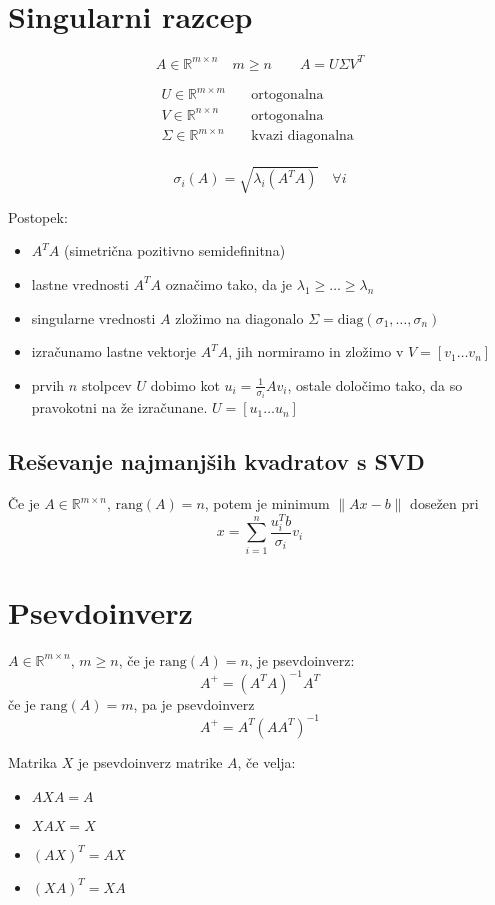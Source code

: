 \begin{multicols}{5}
\section{Singularni razcep}
\[ A \in \mathbb{R}^{m\times n} \quad m \geq n \qquad A = U \Sigma V^T\]

\begin{align*}
	U \in \mathbb{R}^{m\times m} \quad &\text{ortogonalna } \\
	V \in \mathbb{R}^{n\times n} \quad &\text{ortogonalna } \\
	\Sigma \in \mathbb{R}^{m\times n} \quad &\text{kvazi diagonalna } \\
\end{align*}

\[ \sigma_i (A) = \sqrt{\lambda_i(A^TA)} \quad \forall i\]

Postopek:
\begin{itemize}
	\item $A^TA$ (simetrična pozitivno semidefinitna)
	\item lastne vrednosti $A^TA$ označimo tako, da je $\lambda_1 \geq \dots \geq \lambda_n$
	\item singularne vrednosti $A$ zložimo na diagonalo $\Sigma = \text{diag}(\sigma_1, \dots, \sigma_n)$
	\item izračunamo lastne vektorje $A^TA$, jih normiramo in zložimo v $V = [v_1 \dots v_n]$
	\item prvih $n$ stolpcev $U$ dobimo kot $u_i = \frac{1}{\sigma_i} A v_i$, ostale določimo tako, da so pravokotni na že izračunane. $U = [u_1 \dots u_n]$
\end{itemize}

\subsection{Reševanje najmanjših kvadratov s SVD}
Če je $A \in \mathbb{R}^{m\times n}$, $\text{rang}(A) = n$, potem je minimum $\| Ax - b\|$ dosežen pri
\[ x = \sum_{i=1}^n \frac{u_i^Tb}{\sigma_i} v_i\]

\section{Psevdoinverz}
$A \in \mathbb{R}^{m\times n}$, $m \geq n$, če je $\text{rang}(A) = n$, je psevdoinverz:
\[A^+ = (A^TA)^{-1}A^T \]
če je $\text{rang}(A) = m$, pa je psevdoinverz
\[A^+ = A^T(AA^T)^{-1} \]

Matrika $X$ je psevdoinverz matrike $A$, če velja:
\begin{itemize}
	\item $AXA = A$
	\item $XAX = X$
	\item $(AX)^T=AX$
	\item $(XA)^T=XA$
\end{itemize}


\end{multicols}
